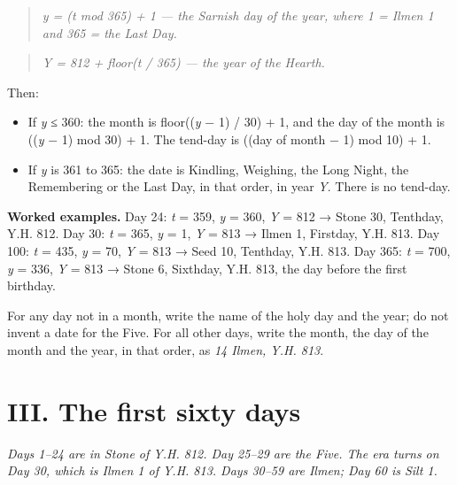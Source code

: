 \documentclass{design/chronicle}
\begin{document}
\begin{quote}\itshape \emph{y} = (\emph{t} mod 365) + 1  — the Sarnish day of the year, where 1 = Ilmen 1 and 365 = the Last Day.\end{quote}

\begin{quote}\itshape \end{quote}

\begin{quote}\itshape \emph{Y} = 812 + floor(\emph{t} / 365)  — the year of the Hearth.\end{quote}

Then:

\begin{itemize}[leftmargin=1.4em,itemsep=1pt,topsep=3pt,parsep=0pt]

\item If \emph{y} ≤ 360: the month is floor((\emph{y} − 1) / 30) + 1, and the day of the month is ((\emph{y} − 1) mod 30) + 1. The tend-day is ((day of month − 1) mod 10) + 1.

\item If \emph{y} is 361 to 365: the date is Kindling, Weighing, the Long Night, the Remembering or the Last Day, in that order, in year \emph{Y}. There is no tend-day.

\end{itemize}

\textbf{Worked examples.} Day 24: \emph{t} = 359, \emph{y} = 360, \emph{Y} = 812 → Stone 30, Tenthday, Y.H. 812. Day 30: \emph{t} = 365, \emph{y} = 1, \emph{Y} = 813 → Ilmen 1, Firstday, Y.H. 813. Day 100: \emph{t} = 435, \emph{y} = 70, \emph{Y} = 813 → Seed 10, Tenthday, Y.H. 813. Day 365: \emph{t} = 700, \emph{y} = 336, \emph{Y} = 813 → Stone 6, Sixthday, Y.H. 813, the day before the first birthday.

For any day not in a month, write the name of the holy day and the year; do not invent a date for the Five. For all other days, write the month, the day of the month and the year, in that order, as \emph{14 Ilmen, Y.H. 813}.

\CRrule

\section*{III. The first sixty days}

\emph{Days 1–24 are in Stone of Y.H. 812. Day 25–29 are the Five. The era turns on Day 30, which is Ilmen 1 of Y.H. 813. Days 30–59 are Ilmen; Day 60 is Silt 1.}
\end{document}
